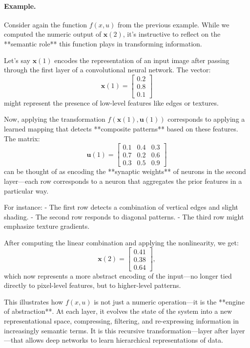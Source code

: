 \paragraph{Example.} Consider again the function \(f(x, u)\) from the previous example. While we computed the numeric output of \(\mathbf{x}(2)\), it’s instructive to reflect on the **semantic role** this function plays in transforming information.

Let’s say \(\mathbf{x}(1)\) encodes the representation of an input image after passing through the first layer of a convolutional neural network. The vector:
\[
\mathbf{x}(1) = 
\begin{bmatrix}
0.2 \\
0.8 \\
0.1
\end{bmatrix}
\]
might represent the presence of low-level features like edges or textures.

Now, applying the transformation \(f(\mathbf{x}(1), \mathbf{u}(1))\) corresponds to applying a learned mapping that detects **composite patterns** based on these features. The matrix:
\[
\mathbf{u}(1) =
\begin{bmatrix}
0.1 & 0.4 & 0.3 \\
0.7 & 0.2 & 0.6 \\
0.3 & 0.5 & 0.9
\end{bmatrix}
\]
can be thought of as encoding the **synaptic weights** of neurons in the second layer—each row corresponds to a neuron that aggregates the prior features in a particular way.

For instance:
- The first row detects a combination of vertical edges and slight shading.
- The second row responds to diagonal patterns.
- The third row might emphasize texture gradients.

After computing the linear combination and applying the nonlinearity, we get:
\[
\mathbf{x}(2) = 
\begin{bmatrix}
0.41 \\
0.38 \\
0.64
\end{bmatrix},
\]
which now represents a more abstract encoding of the input—no longer tied directly to pixel-level features, but to higher-level patterns.

This illustrates how \(f(x, u)\) is not just a numeric operation—it is the **engine of abstraction**. At each layer, it evolves the state of the system into a new representational space, compressing, filtering, and re-expressing information in increasingly semantic terms. It is this recursive transformation—layer after layer—that allows deep networks to learn hierarchical representations of data.


